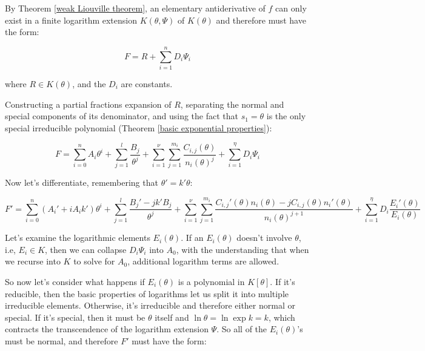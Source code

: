 \vfill\eject
\proof


By Theorem \ref{weak Liouville theorem}, an elementary antiderivative
of $f$ can only exist in a finite logarithm extension $K(\theta, \Psi)$
of $K(\theta)$ and therefore must have the form:

$$F = R + \sum_{i=1}^n D_i \Psi_i$$

where $R \in K(\theta)$, and the $D_i$ are constants.

Constructing a partial fractions expansion of $R$,
separating the normal and special components of its denominator,
and using the fact that $s_1 = \theta$ is the only
special irreducible polynomial
(Theorem \ref{basic exponential properties}):

\begin{comment}
$$F = \sum_{i=0}^n A_i \theta^i + \sum_{i=1}^\mu \sum_{j=1}^{l_i} \frac{B_{ij}(\theta)}{s_i(\theta)^j}
+ \sum_{i=1}^\nu \sum_{j=1}^{m_i} \frac{C_{i,j}(\theta)}{n_i(\theta)^j}
+ \sum_{i=1}^\eta D_i \Psi_i$$

Let's use the fact that $s_1 = \theta$ is the only
special irreducible polynomial:
\end{comment}

$$F = \sum_{i=0}^n A_i \theta^i + \sum_{j=1}^{l} \frac{B_{j}}{\theta^j}
+ \sum_{i=1}^\nu \sum_{j=1}^{m_i} \frac{C_{i,j}(\theta)}{n_i(\theta)^j}
+ \sum_{i=1}^\eta D_i \Psi_i$$

Now let's differentiate, remembering that $\theta' = k'\theta$:

$$F' = \sum_{i=0}^n (A_i' + i A_i k' )\theta^i
  + \sum_{j=1}^{l} \frac{B_{j}' - j k' B_{j}}{\theta^j}
  + \sum_{i=1}^\nu \sum_{j=1}^{m_i} \frac{C_{i,j}'(\theta) n_i(\theta) - j C_{i,j}(\theta) n_i'(\theta) }{n_i(\theta)^{j+1}}
  + \sum_{i=1}^\eta D_i \frac{E_i'(\theta)}{E_i(\theta)}$$

Let's examine the logarithmic elements $E_i(\theta)$.  If an $E_i(\theta)$ doesn't involve $\theta$, i.e, $E_i \in K$,
then we can collapse $D_i \Psi_i$ into $A_0$, with the understanding that when we recurse
into $K$ to solve for $A_0$, additional logarithm terms are allowed.

So now let's consider what happens if $E_i(\theta)$ is a polynomial in $K[\theta]$.  If it's reducible, then
the basic properties of logarithms let us split it into multiple irreducible elements.
Otherwise, it's irreducible and therefore either normal or special.  If it's special, then it
must be $\theta$ itself and $\ln \theta = \ln \exp k = k$, which contracts the
transcendence of the logarithm extension $\Psi$.
So all of the $E_i(\theta)$'s must be normal, and therefore $F'$ must have the form:

